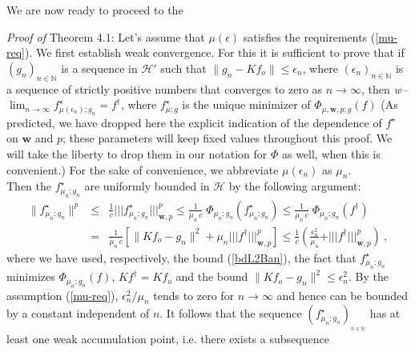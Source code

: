 \documentclass[10pt]{article}
\def\N{\mathbb{N}}
\def\cH{\mathcal{H}}
\def\fs{f^{\dagger}}
\newcommand\eref[1]{(\ref{#1})}
\def\Vvert{\vert\!\vert\!\vert}
\begin{document}
We are now ready to proceed to the

{\em Proof of }Theorem 4.1:
\newline
Let's assume that $\mu(\epsilon)$ satisfies the requirements \eref{mu-req}.
\newline
We first establish weak convergence. For this it is sufficient to prove
that if $(g_n)_{n \in \N}$ is a sequence in $\cH'$ such that
$\|g_n-Kf_o\| \leq \epsilon_n$, where
$(\epsilon_n)_{n \in \N}$ is a sequence of strictly positive numbers
that converges to zero
as $n \to \infty$, then {\em w}$\,$--$\lim_{n \to \infty}
f^{\star}_{\mu(\epsilon_n);g_n}= f^\dagger$, where $f^{\star}_{\mu;g}$
is the unique minimizer of $\Phi_{\mu ,\mathbf{w},p;g}(f)$
(As predicted, we have dropped here the
explicit indication of the dependence of $f^{\star}$ on $\mathbf{w}$ and
$p$; these
parameters will keep fixed values throughout this proof. We will take the
liberty
to drop them in our notation for $\Phi$ as well, when this is convenient.)
For the sake of convenience,
we abbreviate $\mu(\epsilon_n)$ as $\mu_n$. \\
Then the $f^{\star}_{\mu_n;g_n}$ are uniformly bounded in $\cH$
by the following argument:
\begin{eqnarray}
\|  f^\star_{\mu_n;g_n} \|^p &\leq &  \frac{1}{c}
\Vvert f^\star_{\mu_n;g_n} \Vvert_{\mathbf{w},p}^p
\leq \frac{1}{\mu_n \, c}\;\Phi_{\mu_n; g_n}(f^\star_{\mu_n;g_n})
\leq \frac{1}{\mu_n \, c}\; \Phi_{\mu_n;g_n}(\fs )\nonumber \\
&=&\frac{1}{\mu_n \, c}\left[\|Kf_o-g_n \|^2
+ \mu_n \Vvert \fs \Vvert^p_{\mathbf{w},p} \right]
\leq  \frac{1}{c} \left( \frac{\epsilon_n^2}{\mu_n}+\Vvert f^\dagger
\Vvert_{\mathbf{w},p}^p \right) ~,
\label{fmuubd}
\end{eqnarray}
where we have used, respectively,
the bound (\ref{bdL2Ban}), the fact that $f^\star_{\mu_n;g_n}$
minimizes $\Phi_{\mu_n;g_n}(f)$, $K\fs = Kf_o$
and the bound $\|Kf_o-g_n\|^2 \leq \epsilon_n^2$.
By the assumption \eref{mu-req}, $\epsilon_n^2 /\mu_n$ tends to zero for
$n\to\infty$ and hence can be bounded by a constant independent of $n$.
\newline
It
follows that the sequence $(f^\star_{\mu_n;g_n})_{_{n\in \N}}$ has at least
one weak
accumulation point, i.e. there exists a subsequence
\end{document}

